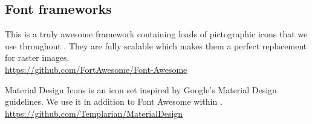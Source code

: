 \subsection{Font frameworks}

\begin{description}[align=left,style=nextline,leftmargin=*,labelsep=\parindent,font=\bfseries]
	\item[Font Awesome] This is a truly awesome framework containing loads of pictographic icons that we use throughout {\germinate}. They are fully scalable which makes them a perfect replacement for raster images. \\\url{https://github.com/FortAwesome/Font-Awesome}
	\item[Material Design Icons] Material Design Icons is an icon set inspired by Google's Material Design guidelines. We use it in addition to Font Awesome within {\germinate}. \\\url{https://github.com/Templarian/MaterialDesign}
\end{description}

